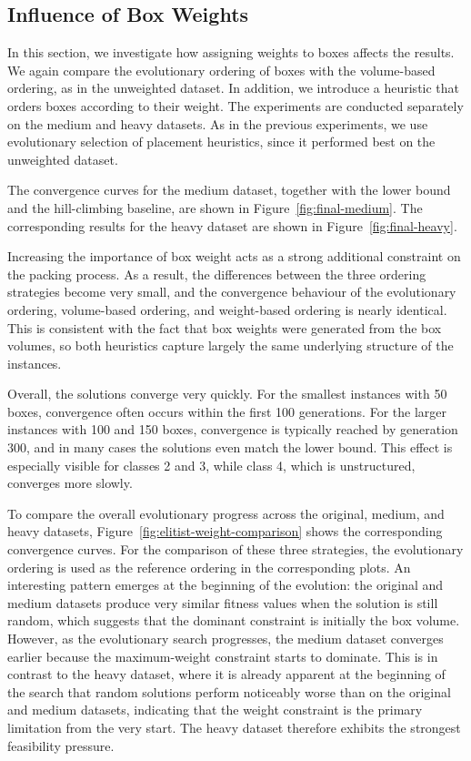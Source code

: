 \subsection{Influence of Box Weights}

In this section, we investigate how assigning weights to boxes affects the results. 
We again compare the evolutionary ordering of boxes with the volume-based ordering, as in the unweighted dataset. 
In addition, we introduce a heuristic that orders boxes according to their weight.
The experiments are conducted separately on the medium and heavy datasets. 
As in the previous experiments, we use evolutionary selection of placement heuristics, since it performed best on the unweighted dataset.

The convergence curves for the medium dataset, together with the lower bound and the hill-climbing baseline, are shown in Figure~\ref{fig:final-medium}. 
The corresponding results for the heavy dataset are shown in Figure~\ref{fig:final-heavy}. 

Increasing the importance of box weight acts as a strong additional constraint on the packing process. 
As a result, the differences between the three ordering strategies become very small, and the convergence behaviour of the evolutionary ordering, volume-based ordering, and weight-based ordering is nearly identical. 
This is consistent with the fact that box weights were generated from the box volumes, so both heuristics capture largely the same underlying structure of the instances. 
 
Overall, the solutions converge very quickly. 
For the smallest instances with 50 boxes, convergence often occurs within the first 100 generations. 
For the larger instances with 100 and 150 boxes, convergence is typically reached by generation 300, and in many cases the solutions even match the lower bound. 
This effect is especially visible for classes 2 and 3, while class 4, which is unstructured, converges more slowly. 

To compare the overall evolutionary progress across the original, medium, and heavy datasets, Figure~\ref{fig:elitist-weight-comparison} shows the corresponding convergence curves. 
For the comparison of these three strategies, the evolutionary ordering is used as the reference ordering in the corresponding plots. 
An interesting pattern emerges at the beginning of the evolution: the original and medium datasets produce very similar fitness values when the solution is still random, which suggests that the dominant constraint is initially the box volume. 
However, as the evolutionary search progresses, the medium dataset converges earlier because the maximum-weight constraint starts to dominate. 
This is in contrast to the heavy dataset, where it is already apparent at the beginning of the search that random solutions perform noticeably worse than on the original and medium datasets, indicating that the weight constraint is the primary limitation from the very start. 
The heavy dataset therefore exhibits the strongest feasibility pressure. 

